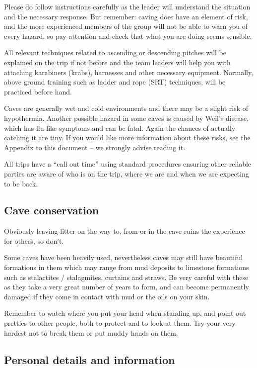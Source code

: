 \documentclass[a4paper,11pt]{article}
\begin{document}
Please do follow instructions carefully
as the leader will understand the situation and the necessary response.  But
remember: caving does have an element of risk, and the more experienced members
of the group will not be able to warn you of every hazard, so pay attention and
check that what you are doing seems sensible.

All relevant techniques related to ascending or descending pitches will be
explained on the trip if not before and the team leaders will help you with
attaching karabiners (krabs), harnesses and other necessary equipment.
Normally, above ground training such as ladder and rope (SRT) techniques, will
be practiced before hand.

Caves are generally
wet and cold environments and there may be a slight risk of hypothermia.
Another possible hazard in some caves is caused by Weil's disease, which has
flu-like symptoms and can be fatal.  Again the chances of actually catching it
are tiny.  If you would like more information about these risks, see the
Appendix to this document -- we strongly advise reading it.

All trips have a ``call out time'' using standard procedures ensuring other
reliable parties are aware of who is on the trip, where we are and when we are
expecting to be back.

\subsection*{Cave conservation}

Obviously leaving litter on the way to, from or in the cave ruins the
experience for others, so don't.

Some caves have been heavily used, nevertheless caves may
still have beautiful formations in them which may range from mud deposits to
limestone formations such as stalactites / stalagmites, curtains and straws.
Be very careful with these as they take a very great number of years to form, and can
become permanently damaged if they come in contact with mud or the oils on your
skin.

Remember to watch where you put your head when standing up, and
point out pretties to other people, both to protect and to look at them.  Try
your very hardest not to break them or put muddy hands on them.

\subsection*{Personal details and information}
\end{document}
